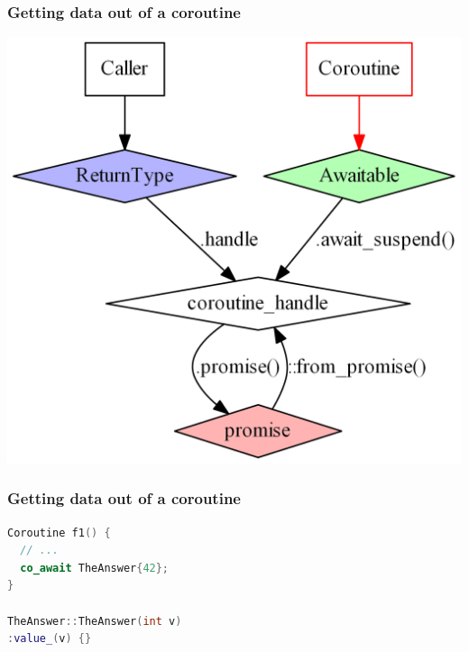 \documentclass[aspectratio=169]{beamer}
\begin{document}
\begin{frame}[fragile]
  \frametitle{Getting data out of a coroutine}
  \pause
  \begin{center}
  \includegraphics[height=.9\textheight]{corogfx/path_out_010.png}
  \end{center}
  
\end{frame}

\begin{frame}[fragile]
  \frametitle{Getting data out of a coroutine}
  
  \begin{lstlisting}[language={C++}]
Coroutine f1() {
  // ...
  co_await TheAnswer{42};
}

TheAnswer::TheAnswer(int v)
:value_(v) {}
  \end{lstlisting}
\end{frame}
\end{document}
